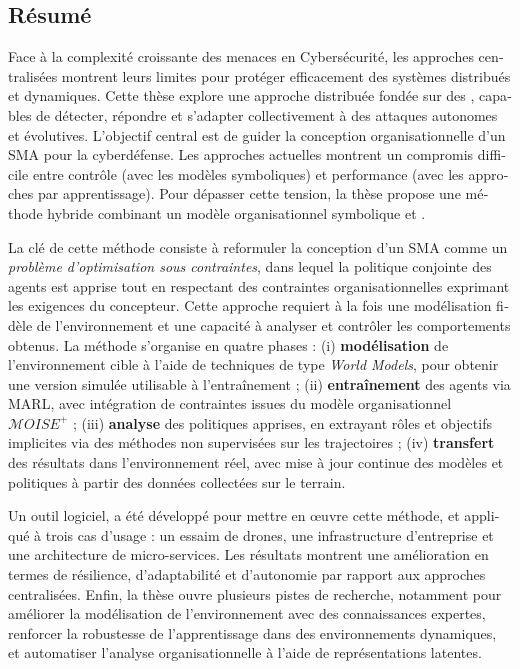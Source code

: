 \renewcommand{\abstractname}{Abstract}
\begingroup
\let\clearpage\relax
\let\cleardoublepage\relax
\let\cleardoublepage\relax

\begin{otherlanguage}{ngerman}
    \chapter*{Résumé}

    Face à la complexité croissante des menaces en Cybersécurité, les approches centralisées montrent leurs limites pour protéger efficacement des systèmes distribués et dynamiques. Cette thèse explore une approche distribuée fondée sur des , capables de détecter, répondre et s'adapter collectivement à des attaques autonomes et évolutives.
    L'objectif central est de guider la conception organisationnelle d'un SMA pour la cyberdéfense. Les approches actuelles montrent un compromis difficile entre contrôle (avec les modèles symboliques) et performance (avec les approches par apprentissage). Pour dépasser cette tension, la thèse propose une méthode hybride combinant un modèle organisationnel symbolique et .

    La clé de cette méthode consiste à reformuler la conception d'un SMA comme un \textit{problème d'optimisation sous contraintes}, dans lequel la politique conjointe des agents est apprise tout en respectant des contraintes organisationnelles exprimant les exigences du concepteur. Cette approche requiert à la fois une modélisation fidèle de l'environn\-ement et une capacité à analyser et contrôler les comportements obtenus.
    La méthode s'organise en quatre phases : (i) \textbf{modélisation} de l'environnement cible à l'aide de techniques de type \textit{World Models}, pour obtenir une version simulée utilisable à l'entraînement ; (ii) \textbf{entraînement} des agents via MARL, avec intégration de contraintes issues du modèle organisationnel $\mathcal{M}OISE^+$ ; (iii) \textbf{analyse} des politiques apprises, en extrayant rôles et objectifs implicites via des méthodes non supervisées sur les trajectoires ; (iv) \textbf{transfert} des résultats dans l'environnement réel, avec mise à jour continue des modèles et politiques à partir des données collectées sur le terrain.

    Un outil logiciel, a été développé pour mettre en œuvre cette méthode, et appliqué à trois cas d'usage : un essaim de drones, une infrastructure d'entreprise et une architecture de micro-services. Les résultats montrent une amélioration en termes de résilience, d'adaptabilité et d'autonomie par rapport aux approches centralisées.
    Enfin, la thèse ouvre plusieurs pistes de recherche, notamment pour améliorer la modélisation de l'environnement avec des connaissances expertes, renforcer la robustesse de l'apprentissage dans des environnements dynamiques, et automatiser l'analyse organisationnelle à l'aide de représentations latentes.


\end{otherlanguage}
